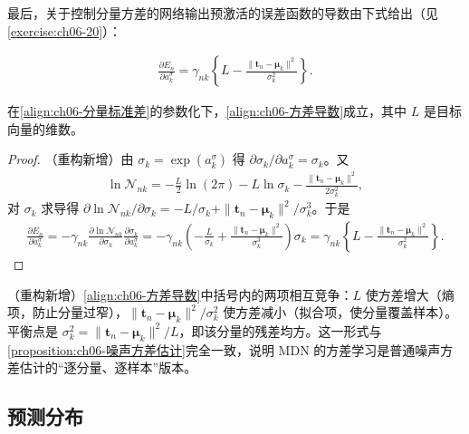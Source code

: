 \documentclass[../../main.tex]{subfiles}
\begin{document}
最后，关于控制分量方差的网络输出预激活的误差函数的导数由下式给出（见\cref{exercise:ch06-20}）：

\begin{align}
\frac{\partial E_n}{\partial a_k^{\sigma}}=\gamma_{nk}\left\{L-\frac{\|\boldsymbol{t}_n-\boldsymbol{\mu}_k\|^{2}}{\sigma_k^{2}}\right\}.
\label{align:ch06-方差导数}
\end{align}

\begin{proposition}[分量方差预激活的导数]\label{proposition:ch06-方差导数}
在\eqref{align:ch06-分量标准差}的参数化下，\eqref{align:ch06-方差导数}成立，其中 $L$ 是目标向量的维数。
\end{proposition}

\begin{proof}
（重构新增）由 $\sigma_k=\exp(a_k^{\sigma})$ 得 $\partial\sigma_k/\partial a_k^{\sigma}=\sigma_k$。又
\begin{align}
\ln\mathcal{N}_{nk}=-\frac{L}{2}\ln(2\pi)-L\ln\sigma_k-\frac{\|\boldsymbol{t}_n-\boldsymbol{\mu}_k\|^{2}}{2\sigma_k^{2}},
\end{align}
对 $\sigma_k$ 求导得 $\partial\ln\mathcal{N}_{nk}/\partial\sigma_k=-L/\sigma_k+\|\boldsymbol{t}_n-\boldsymbol{\mu}_k\|^{2}/\sigma_k^{3}$。于是
\begin{align}
\frac{\partial E_n}{\partial a_k^{\sigma}}
=-\gamma_{nk}\frac{\partial\ln\mathcal{N}_{nk}}{\partial\sigma_k}\frac{\partial\sigma_k}{\partial a_k^{\sigma}}
=-\gamma_{nk}\left(-\frac{L}{\sigma_k}+\frac{\|\boldsymbol{t}_n-\boldsymbol{\mu}_k\|^{2}}{\sigma_k^{3}}\right)\sigma_k
=\gamma_{nk}\left\{L-\frac{\|\boldsymbol{t}_n-\boldsymbol{\mu}_k\|^{2}}{\sigma_k^{2}}\right\}.
\end{align}
\end{proof}

\begin{remark}（重构新增）\eqref{align:ch06-方差导数}中括号内的两项相互竞争：$L$ 使方差增大（熵项，防止分量过窄），$\|\boldsymbol{t}_n-\boldsymbol{\mu}_k\|^{2}/\sigma_k^{2}$ 使方差减小（拟合项，使分量覆盖样本）。平衡点是 $\sigma_k^{2}=\|\boldsymbol{t}_n-\boldsymbol{\mu}_k\|^{2}/L$，即该分量的残差均方。这一形式与\cref{proposition:ch06-噪声方差估计}完全一致，说明 MDN 的方差学习是普通噪声方差估计的“逐分量、逐样本”版本。
\end{remark}

\subsection{预测分布}\label{subsection:ch06-预测分布}
\end{document}

